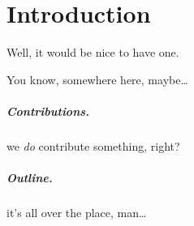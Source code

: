 \chapter{Introduction}

Well, it would be nice to have one. 

You know, somewhere here, maybe\dots

\paragraph*{ Contributions. } we \emph{do} contribute something, right?
\paragraph*{ Outline. } it's all over the place, man\dots